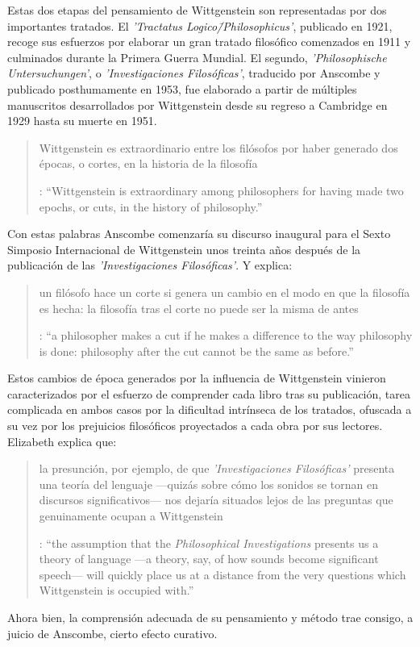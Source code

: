 Estas dos etapas del pensamiento de Wittgenstein son representadas por dos importantes tratados. El \emph{'Tractatus Logico\=/Philosophicus'}, publicado en 1921, recoge sus esfuerzos por elaborar un gran tratado filosófico comenzados en 1911 y culminados durante la Primera Guerra Mundial. El segundo, \emph{'Philosophische Untersuchungen'}, o \emph{'Investigaciones Filosóficas'}, traducido por Anscombe y publicado posthumamente en 1953, fue elaborado a partir de múltiples manuscritos desarrollados por Wittgenstein desde su regreso a Cambridge en 1929 hasta su muerte en 1951.

\blockquote[{\cite[181]{anscombe2011plato:twocuts}}: \enquote{Wittgenstein is extraordinary among philosophers for having made two epochs, or cuts, in the history of philosophy.}]{Wittgenstein es extraordinario entre los filósofos por haber generado dos épocas, o cortes, en la historia de la filosofía}. Con estas palabras Anscombe comenzaría su discurso inaugural para el Sexto Simposio Internacional de Wittgenstein unos treinta años después de la publicación de las \emph{'Investigaciones Filosóficas'}. Y explica: \blockquote[{\cite[181]{anscombe2011plato:twocuts}}: \enquote{a philosopher makes a cut if he makes a difference to the way philosophy is done: philosophy after the cut cannot be the same as before.}]{un filósofo hace un corte si genera un cambio en el modo en que la filosofía es hecha: la filosofía tras el corte no puede ser la misma de antes}.

Estos cambios de época generados por la influencia de Wittgenstein vinieron caracterizados por el esfuerzo de comprender cada libro tras su publicación, tarea complicada en ambos casos por la dificultad intrínseca de los tratados, ofuscada a su vez por los prejuicios filosóficos proyectados a cada obra por sus lectores.  Elizabeth explica que: \blockquote[{\cite[Cf.~][183]{anscombe2011plato:twocuts}}: \enquote{the assumption that the \emph{Philosophical Investigations} presents us a theory of language ---a theory, say, of how sounds become significant speech--- will quickly place us at a distance from the very questions which Wittgenstein is occupied with.}]{la presunción, por ejemplo, de que \emph{'Investigaciones Filosóficas'} presenta una teoría del lenguaje ---quizás sobre cómo los sonidos se tornan en discursos significativos--- nos dejaría situados lejos de las preguntas que genuinamente ocupan a Wittgenstein}. Ahora bien, la comprensión adecuada de su pensamiento y método trae consigo, a juicio de Anscombe, cierto efecto curativo.

